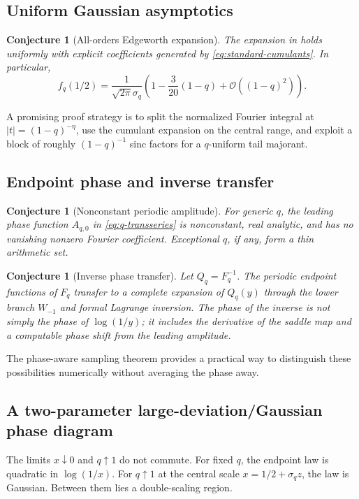 \documentclass[11pt,oneside]{article}
\newtheorem{conjecture}[theorem]{Conjecture}
\theoremstyle{definition}
\theoremstyle{remark}
\newcommand{\bigO}{\mathcal O}
\begin{document}
\subsection{Uniform Gaussian asymptotics}

\begin{conjecture}[All-orders Edgeworth expansion]
The expansion in  holds uniformly with explicit coefficients generated by
\eqref{eq:standard-cumulants}.  In particular,
\[
 f_q(1/2)
 =\frac{1}{\sqrt{2\pi}\sigma_q}
  \left(1-\frac{3}{20}(1-q)+\bigO((1-q)^2)\right).
\]
\end{conjecture}

A promising proof strategy is to split the normalized Fourier integral at
$|t|=(1-q)^{-\eta}$, use the cumulant expansion on the central range, and exploit a block of
roughly $(1-q)^{-1}$ sinc factors for a $q$-uniform tail majorant.

\subsection{Endpoint phase and inverse transfer}

\begin{conjecture}[Nonconstant periodic amplitude]
For generic $q$, the leading phase function $A_{q,0}$ in
\eqref{eq:q-transseries} is nonconstant, real analytic, and has no vanishing nonzero Fourier
coefficient.  Exceptional $q$, if any, form a thin arithmetic set.
\end{conjecture}

\begin{conjecture}[Inverse phase transfer]
Let $Q_q=F_q^{-1}$.  The periodic endpoint functions of $F_q$ transfer to a complete expansion
of $Q_q(y)$ through the lower branch $W_{-1}$ and formal Lagrange inversion.  The phase of the
inverse is not simply the phase of $\log(1/y)$; it includes the derivative of the saddle map
and a computable phase shift from the leading amplitude.
\end{conjecture}

The phase-aware sampling theorem provides a practical way to distinguish these possibilities
numerically without averaging the phase away.

\subsection{A two-parameter large-deviation/Gaussian phase diagram}

The limits $x\downarrow0$ and $q\uparrow1$ do not commute.  For fixed $q$, the endpoint law is
quadratic in $\log(1/x)$.  For $q\uparrow1$ at the central scale
$x=1/2+\sigma_qz$, the law is Gaussian.  Between them lies a double-scaling region.
\end{document}
